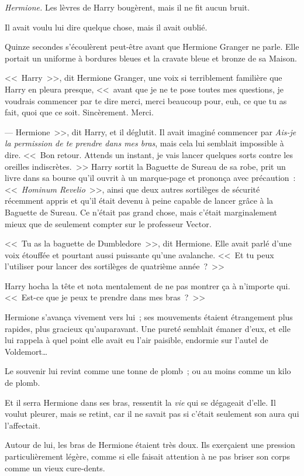 \emph{Hermione.} Les lèvres de Harry bougèrent, mais il ne fit aucun bruit.

Il avait voulu lui dire quelque chose, mais il avait oublié.

Quinze secondes s'écoulèrent peut-être avant que Hermione Granger ne parle. Elle portait un uniforme à bordures bleues et la cravate bleue et bronze de sa Maison.

<<~Harry~>>, dit Hermione Granger, une voix si terriblement familière que Harry en pleura presque, <<~avant que je ne te pose toutes mes questions, je voudrais commencer par te dire merci, merci beaucoup pour, euh, ce que tu as fait, quoi que ce soit. Sincèrement. Merci.

--- Hermione~>>, dit Harry, et il déglutit. Il avait imaginé commencer par \emph{Ais-je la permission de te prendre dans mes bras}, mais cela lui semblait impossible à dire. <<~Bon retour. Attends un instant, je vais lancer quelques sorts contre les oreilles indiscrètes.~>> Harry sortit la Baguette de Sureau de sa robe, prit un livre dans sa bourse qu'il ouvrit à un marque-page et prononça avec précaution~: <<~\emph{Hominum Revelio}~>>, ainsi que deux autres sortilèges de sécurité récemment appris et qu'il était devenu à peine capable de lancer grâce à la Baguette de Sureau. Ce n'était pas grand chose, mais c'était marginalement mieux que de seulement compter sur le professeur Vector.

<<~Tu as la baguette de Dumbledore~>>, dit Hermione. Elle avait parlé d'une voix étouffée et pourtant aussi puissante qu'une avalanche. <<~Et tu peux l'utiliser pour lancer des sortilèges de quatrième année~?~>>

Harry hocha la tête et nota mentalement de ne pas montrer ça à n'importe qui. <<~Est-ce que je peux te prendre dans mes bras~?~>>

Hermione s'avança vivement vers lui~; ses mouvements étaient étrangement plus rapides, plus gracieux qu'auparavant. Une pureté semblait émaner d'eux, et elle lui rappela à quel point elle avait eu l'air paisible, endormie sur l'autel de Voldemort…

Le souvenir lui revint comme une tonne de plomb~; ou au moins comme un kilo de plomb.

Et il serra Hermione dans ses bras, ressentit la \emph{vie} qui se dégageait d'elle. Il voulut pleurer, mais se retint, car il ne savait pas si c'était seulement son aura qui l'affectait.

Autour de lui, les bras de Hermione étaient très doux. Ils exerçaient une pression particulièrement légère, comme si elle faisait attention à ne pas briser son corps comme un vieux cure-dents.

